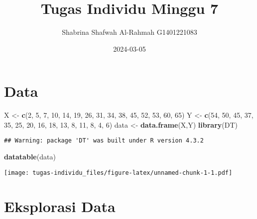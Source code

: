 \documentclass[
]{article}
\title{Tugas Individu Minggu 7}
\author{Shabrina Shafwah Al-Rahmah G1401221083}
\date{2024-03-05}
\newenvironment{Shaded}{\begin{snugshade}}{\end{snugshade}}
\newcommand{\DecValTok}[1]{\textcolor[rgb]{0.00,0.00,0.81}{#1}}
\newcommand{\FunctionTok}[1]{\textcolor[rgb]{0.13,0.29,0.53}{\textbf{#1}}}
\newcommand{\NormalTok}[1]{#1}
\newcommand{\OtherTok}[1]{\textcolor[rgb]{0.56,0.35,0.01}{#1}}
\begin{document}
\maketitle

\hypertarget{data}{%
\section{Data}\label{data}}

\begin{Shaded}
\begin{Highlighting}[]
\NormalTok{X }\OtherTok{\textless{}{-}} \FunctionTok{c}\NormalTok{(}\DecValTok{2}\NormalTok{, }\DecValTok{5}\NormalTok{, }\DecValTok{7}\NormalTok{, }\DecValTok{10}\NormalTok{, }\DecValTok{14}\NormalTok{, }\DecValTok{19}\NormalTok{, }\DecValTok{26}\NormalTok{, }\DecValTok{31}\NormalTok{, }\DecValTok{34}\NormalTok{, }\DecValTok{38}\NormalTok{, }\DecValTok{45}\NormalTok{, }\DecValTok{52}\NormalTok{, }\DecValTok{53}\NormalTok{, }\DecValTok{60}\NormalTok{, }\DecValTok{65}\NormalTok{)}
\NormalTok{Y }\OtherTok{\textless{}{-}} \FunctionTok{c}\NormalTok{(}\DecValTok{54}\NormalTok{, }\DecValTok{50}\NormalTok{, }\DecValTok{45}\NormalTok{, }\DecValTok{37}\NormalTok{, }\DecValTok{35}\NormalTok{, }\DecValTok{25}\NormalTok{, }\DecValTok{20}\NormalTok{, }\DecValTok{16}\NormalTok{, }\DecValTok{18}\NormalTok{, }\DecValTok{13}\NormalTok{, }\DecValTok{8}\NormalTok{, }\DecValTok{11}\NormalTok{, }\DecValTok{8}\NormalTok{, }\DecValTok{4}\NormalTok{, }\DecValTok{6}\NormalTok{)}
\NormalTok{data }\OtherTok{\textless{}{-}} \FunctionTok{data.frame}\NormalTok{(X,Y)}
\FunctionTok{library}\NormalTok{(DT)}
\end{Highlighting}
\end{Shaded}

\begin{verbatim}
## Warning: package 'DT' was built under R version 4.3.2
\end{verbatim}

\begin{Shaded}
\begin{Highlighting}[]
\FunctionTok{datatable}\NormalTok{(data)}
\end{Highlighting}
\end{Shaded}

\texttt{[image: tugas-individu\_files/figure-latex/unnamed-chunk-1-1.pdf]}

\hypertarget{eksplorasi-data}{%
\section{Eksplorasi Data}\label{eksplorasi-data}}
\end{document}
